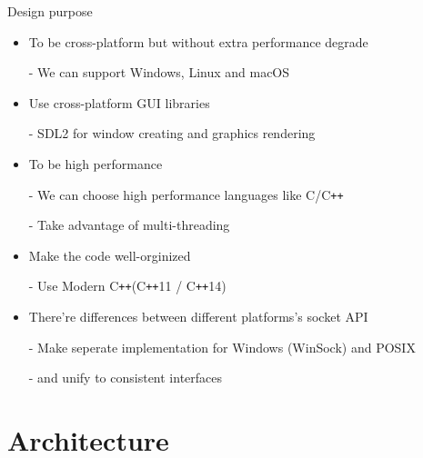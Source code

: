 \documentclass{beamer}
\newcommand{\cpp}{C\texttt{++}}
\begin{document}
\begin{frame}{Design purpose}
  \begin{itemize}
  \item {
    To be cross-platform but without extra performance degrade

    - We can support Windows, Linux and macOS
  }
  \item {
    Use cross-platform GUI libraries

    - SDL2 for window creating and graphics rendering
  }
  \item {
    To be high performance

    - We can choose high performance languages like C/\cpp

    - Take advantage of multi-threading
  }
  \item {
    Make the code well-orginized

    - Use Modern \cpp  (\cpp 11 / \cpp 14)
  }
  \item {
    There're differences between different platforms's socket API

    - Make seperate implementation for Windows (WinSock) and POSIX

    - and unify to consistent interfaces
  }
  \end{itemize}
\end{frame}


\section{Architecture}
\end{document}
